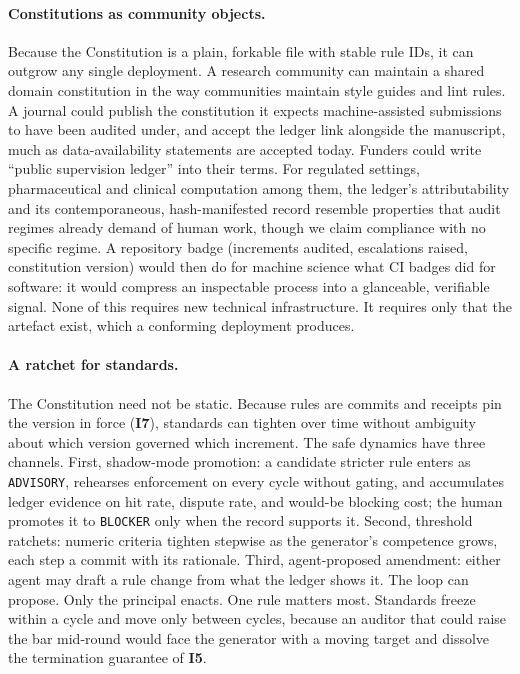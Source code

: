 \documentclass[11pt,letterpaper]{article}
\newcommand{\invariant}[1]{\textbf{I#1}}
\begin{document}
\paragraph{Constitutions as community objects.} Because the Constitution is a plain, forkable file with stable rule IDs, it can outgrow any single deployment. A research community can maintain a shared domain constitution in the way communities maintain style guides and lint rules. A journal could publish the constitution it expects machine-assisted submissions to have been audited under, and accept the ledger link alongside the manuscript, much as data-availability statements are accepted today. Funders could write ``public supervision ledger'' into their terms. For regulated settings, pharmaceutical and clinical computation among them, the ledger's attributability and its contemporaneous, hash-manifested record resemble properties that audit regimes already demand of human work, though we claim compliance with no specific regime. A repository badge (increments audited, escalations raised, constitution version) would then do for machine science what CI badges did for software: it would compress an inspectable process into a glanceable, verifiable signal. None of this requires new technical infrastructure. It requires only that the artefact exist, which a conforming deployment produces.

\paragraph{A ratchet for standards.} The Constitution need not be static. Because rules are commits and receipts pin the version in force (\invariant{7}), standards can tighten over time without ambiguity about which version governed which increment. The safe dynamics have three channels. First, shadow-mode promotion: a candidate stricter rule enters as \texttt{ADVISORY}, rehearses enforcement on every cycle without gating, and accumulates ledger evidence on hit rate, dispute rate, and would-be blocking cost; the human promotes it to \texttt{BLOCKER} only when the record supports it. Second, threshold ratchets: numeric criteria tighten stepwise as the generator's competence grows, each step a commit with its rationale. Third, agent-proposed amendment: either agent may draft a rule change from what the ledger shows it. The loop can propose. Only the principal enacts. One rule matters most. Standards freeze within a cycle and move only between cycles, because an auditor that could raise the bar mid-round would face the generator with a moving target and dissolve the termination guarantee of \invariant{5}.
\end{document}
